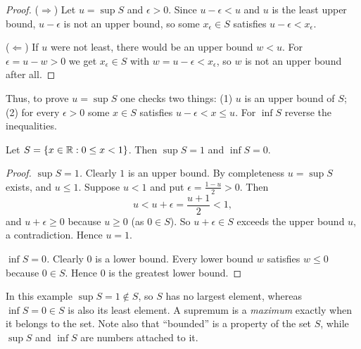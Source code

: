 \begin{proof}
    ($\Rightarrow$) Let $u=\sup S$ and $\epsilon>0$. Since
    $u-\epsilon<u$ and $u$ is the least upper bound, $u-\epsilon$ is not an
    upper bound, so some $x_\epsilon\in S$ satisfies $u-\epsilon<x_\epsilon$.

    ($\Leftarrow$) If $u$ were not least, there would be an upper bound
    $w<u$. For $\epsilon=u-w>0$ we get $x_\epsilon\in S$ with
    $w=u-\epsilon<x_\epsilon$, so $w$ is not an upper bound after all.
\end{proof}

Thus, to prove $u=\sup S$ one checks two things:
(1) $u$ is an upper bound of $S$;
(2) for every $\epsilon>0$ some $x\in S$ satisfies $u-\epsilon<x\leq u$.
For $\inf S$ reverse the inequalities.

\begin{example}\label{ex:half-open}
    Let $S = \left\{x \in \mathbb{R} : 0 \leq x < 1\right\}$. Then $\sup S = 1$ and
    $\inf S = 0$.
\end{example}

\begin{proof}
    \emph{$\sup S=1$.} Clearly $1$ is an upper bound. By completeness
    $u=\sup S$ exists, and $u\leq1$. Suppose $u<1$ and put
    $\epsilon=\frac{1-u}{2}>0$. Then
    \begin{equation*}
        u<u+\epsilon=\frac{u+1}{2}<1,
    \end{equation*}
    and $u+\epsilon\geq0$ because $u\geq0$ (as $0\in S$). So
    $u+\epsilon\in S$ exceeds the upper bound $u$, a contradiction. Hence
    $u=1$.

    \emph{$\inf S=0$.} Clearly $0$ is a lower bound. Every lower bound $w$
    satisfies $w\leq0$ because $0\in S$. Hence $0$ is the greatest lower
    bound.
\end{proof}

\begin{remark}
    In this example $\sup S=1\notin S$, so $S$ has no largest element,
    whereas $\inf S=0\in S$ is also its least element. A supremum is a
    \emph{maximum} exactly when it belongs to the set. Note also that
    ``bounded'' is a property of the set $S$, while $\sup S$ and $\inf S$
    are numbers attached to it.
\end{remark}
